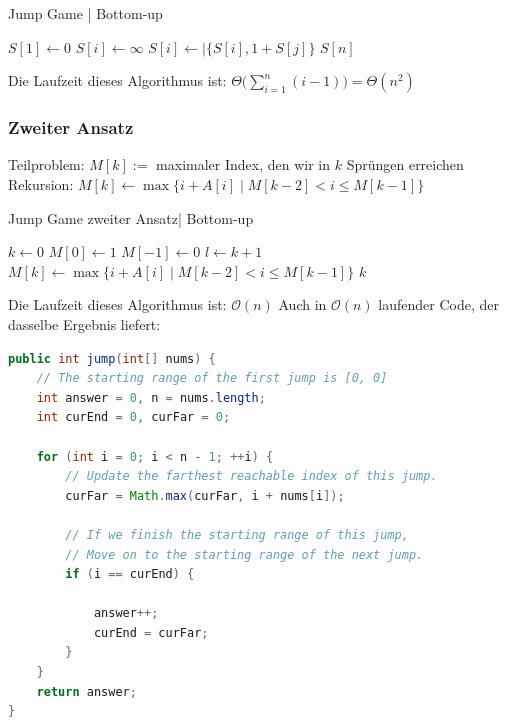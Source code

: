 \documentclass[a4paper]{article}
\begin{document}
\begin{algorithm}[h]
\caption{Jump Game | Bottom-up}
 \label{alg:JumpGame-bottomUp}
\begin{algorithmic}
  \State $S[1] \gets 0$
    \State $S[i] \gets \infty$  
    \State $S[i] \gets \mid\lbrace S[i], 1+S[j] \rbrace$
    \EndIf
    \EndFor
 \EndFor
\State \Return $S[n]$
\end{algorithmic}
\end{algorithm}

Die Laufzeit dieses Algorithmus ist: $\Theta\big(\sum_{i=1}^n(i-1)\big) = \Theta(n^2)$
\subsubsection*{Zweiter Ansatz}
Teilproblem: $M[k] :=$ maximaler Index, den wir in $k$ Sprüngen erreichen \\
Rekursion: $M[k] \gets \max\lbrace i+A[i] \mid M[k-2] < i \leq M[k-1]\rbrace$ 

\begin{algorithm}[h]
\caption{Jump Game zweiter Ansatz| Bottom-up}
 \label{alg:JumpGame2-bottomUp}
\begin{algorithmic}
  \State $k \gets 0$
  \State $M[0] \gets 1$
  \State $M[-1] \gets 0$
    \State $l \gets k+1$
    \State $M[k] \gets \max\lbrace i+A[i] \mid M[k-2] < i \leq M[k-1]\rbrace$ 
    \EndWhile
\State \Return $k$
\end{algorithmic}
\end{algorithm}
Die Laufzeit dieses Algorithmus ist: $\mathcal{O}(n)$
Auch in $\mathcal{O}(n)$ laufender Code, der dasselbe Ergebnis liefert:

\begin{lstlisting}[language = Java , commentstyle=\color{teal}]
public int jump(int[] nums) {
    // The starting range of the first jump is [0, 0]
    int answer = 0, n = nums.length;
    int curEnd = 0, curFar = 0;
        
    for (int i = 0; i < n - 1; ++i) {
        // Update the farthest reachable index of this jump.
        curFar = Math.max(curFar, i + nums[i]);
            
        // If we finish the starting range of this jump,
        // Move on to the starting range of the next jump.
        if (i == curEnd) {

            answer++;
            curEnd = curFar;
        }
    }
    return answer;
}
\end{lstlisting}
\end{document}
